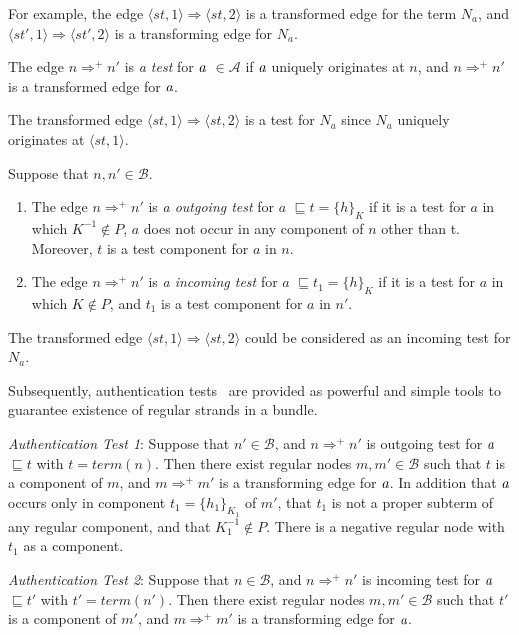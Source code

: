  For example, the edge $\langle st,1\rangle \Rightarrow \langle st,2\rangle$ is a transformed edge for the term $N_a$, and  $\langle st',1\rangle \Rightarrow \langle st',2\rangle$ is a transforming edge for $N_a$. 

\begin{Definition} 
The edge $n \Rightarrow^+ n'$ is \emph{a test} for $\emph{a}$ $\in \mathcal{A}$ if $\emph{a}$ uniquely originates at $n$, and $n \Rightarrow^+ n'$ is a transformed edge for $\emph{a}$. 
\end{Definition}

The transformed edge $\langle st,1\rangle \Rightarrow \langle st,2\rangle$ is a test for $N_a$ since $N_a$ uniquely originates at $\langle st,1\rangle$. 

\begin{Definition} Suppose that $n, n' \in \mathcal{B}$.
\begin{enumerate}
\item The edge $n \Rightarrow^+ n'$ is \emph{a outgoing test} for $a$ $\sqsubseteq t = \{h\}_K$ if it is a test for $a$ in which $K^{-1} \not\in P$, $a$ does not occur in any component of $n$ other than t. Moreover, $t$ is a test component for $a$ in $n$.
\item The edge $n \Rightarrow^+ n'$ is \emph{a incoming test} for $a$ $\sqsubseteq t_1 = \{h\}_K$ if it is a test for $a$ in which $K \not\in P$, and $t_1$ is a test component for $a$ in $n'$.
\end{enumerate}
\end{Definition}

The transformed edge $\langle st,1\rangle \Rightarrow \langle st,2\rangle$ could be considered as an incoming test for $N_a$. 

Subsequently, authentication tests~\cite{authenticationtests} are provided as powerful and simple tools to guarantee existence of regular strands in a bundle. 

\emph{Authentication Test 1}: Suppose that $n' \in \mathcal{B}$, and $n \Rightarrow^+ n'$ is outgoing test for $\emph{a}$ $\sqsubseteq t$ with $t = term(n)$. Then there exist regular nodes $m,m' \in \mathcal{B}$ such that $t$ is a component of $m$, and  $m \Rightarrow^+m'$ is a transforming edge for $\emph{a}$. In addition that $\emph{a}$ occurs only in component $t_1=\{h_1\}_{K_1}$ of $m'$, that $t_1$ is not a proper subterm of any regular component, and that $K^{-1}_1 \not\in P$. There is a negative regular node with $t_1$ as a component. 


\emph{Authentication Test 2}: Suppose that $n \in \mathcal{B}$, and $n \Rightarrow^+ n'$ is incoming test for $\emph{a}$ $\sqsubseteq t'$ with $t' = term(n')$. Then there exist regular nodes $m,m' \in \mathcal{B}$ such that $t'$ is a component of $m'$, and  $m \Rightarrow^+m'$ is a transforming edge for $\emph{a}$. 

